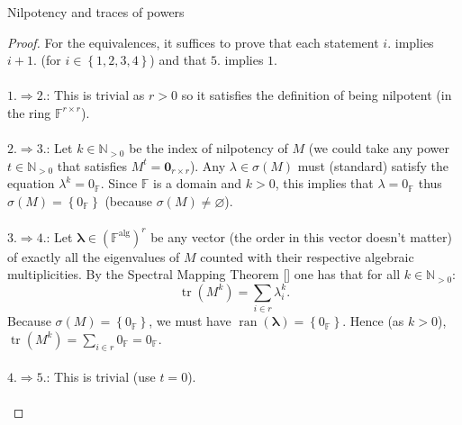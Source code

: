 \begin{appendixitem}{Nilpotency and traces of powers}
    \begin{proof}
        For the equivalences, it suffices to prove that each statement \( i. \) implies \( i+1. \) (for \( i \in \left\{ 1, 2, 3, 4\right\} \)) and that \( 5. \) implies \( 1. \)
        \\\\
        \( 1. \Rightarrow 2. \): This is trivial as \( r > 0 \) so it satisfies the definition of being nilpotent (in the ring \( \mathbb{F}^{r \times r} \)).
        \\\\
        \( 2. \Rightarrow 3. \): Let \( k \in \mathbb{N}_{>0} \) be the index of nilpotency of \( M \) (we could take any power \( t \in \mathbb{N}_{>0} \) that satisfies \( M^{t} = \mathbf{0}_{r \times r} \)). Any \( \lambda \in \sigma\left(M\right) \) must (standard) satisfy the equation \( \lambda^k = 0_{\mathbb{F}} \). Since \( \mathbb{F} \) is a domain and \( k > 0 \), this implies that \( \lambda = 0_{\mathbb{F}} \) thus \( \sigma\left(M\right) = \left\{0_{\mathbb{F}}\right\} \) (because \( \sigma\left(M\right) \neq \varnothing \)).
        \\\\
        \( 3. \Rightarrow 4. \): Let \( \boldsymbol{\lambda} \in \left(\mathbb{F}^{\text{alg}}\right)^r \) be any vector (the order in this vector doesn't matter) of exactly all the eigenvalues of \( M \) counted with their respective algebraic multiplicities. By the Spectral Mapping Theorem [] one has that for all \( k \in \mathbb{N}_{>0} \):
        \[
            \operatorname{tr}\left(M^k\right) = \sum_{i \in r} \lambda_i^k.
        \]
        Because \( \sigma\left(M\right) = \left\{0_{\mathbb{F}}\right\} \), we must have \( \operatorname{ran}\left(\boldsymbol{\lambda}\right) = \left\{0_{\mathbb{F}}\right\} \). Hence (as \( k > 0 \)), \( \operatorname{tr}\left(M^k\right) = \sum_{i \in r} 0_{\mathbb{F}} = 0_{\mathbb{F}} \).
        \\\\
        \( 4. \Rightarrow 5. \): This is trivial (use \( t = 0 \)).
        \\\\

\end{proof}
\end{appendixitem}
